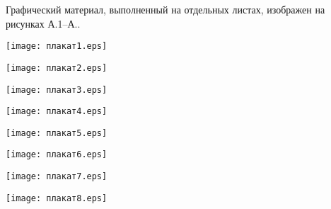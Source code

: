 
Графический материал, выполненный на отдельных листах,
изображен на рисунках А.1--А..
\setcounter{числоПлакатов}{0}

\renewcommand{\thefigure}{А.\arabic{figure}} %

\begin{landscape}

\begin{плакат}
    \texttt{[image: плакат1.eps]}
    \label{pl1:image}      
\end{плакат}

\begin{плакат}
    \texttt{[image: плакат2.eps]}
    \label{pl2:image}      
\end{плакат}

\begin{плакат}
    \texttt{[image: плакат3.eps]}
    \label{pl3:image}      
\end{плакат}

\begin{плакат}
	\texttt{[image: плакат4.eps]}
	\label{pl4:image}      
\end{плакат}

\begin{плакат}
    \texttt{[image: плакат5.eps]}
    \label{pl5:image}      
\end{плакат}

\begin{плакат}
	\texttt{[image: плакат6.eps]}
	\label{p16:image}      
\end{плакат}

\begin{плакат}
	\texttt{[image: плакат7.eps]}
	\label{pl7:image}      
\end{плакат}

\begin{плакат}
	\texttt{[image: плакат8.eps]}
	\label{pl8:image}      
\end{плакат}

\end{landscape}
